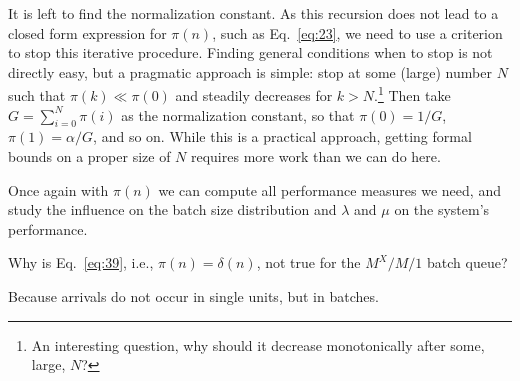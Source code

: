 It is left to find the normalization constant.
As this recursion does not lead to a closed form expression for $\pi(n)$, such as Eq.~\eqref{eq:23}, we need to use a criterion to stop this iterative procedure.
Finding general conditions when to stop is not directly easy, but a pragmatic approach is simple: stop at some (large) number $N$ such that $\pi(k)\ll \pi(0)$ and steadily decreases for $k>N$.\footnote{An interesting question, why should it decrease monotonically after some, large, $N$?}
Then take $G=\sum_{i=0}^N \pi(i)$ as the normalization constant, so that $\pi(0)=1/G$, $\pi(1)=\alpha/G$, and so on.
While this is a practical approach, getting formal bounds on a proper size of $N$ requires more work than we can do here.

Once again with $\pi(n)$ we can compute all performance measures we need, and study the influence on the batch size distribution and $\lambda$ and $\mu$ on the system's performance.

\begin{exercise}[\faFlask]
  Why is Eq.~\eqref{eq:39}, i.e., $\pi(n)=\delta(n)$, not true for the
  $M^X/M/1$ batch queue?
\begin{solution}
 Because arrivals do not occur in single units, but in batches.
\end{solution}
\end{exercise}

